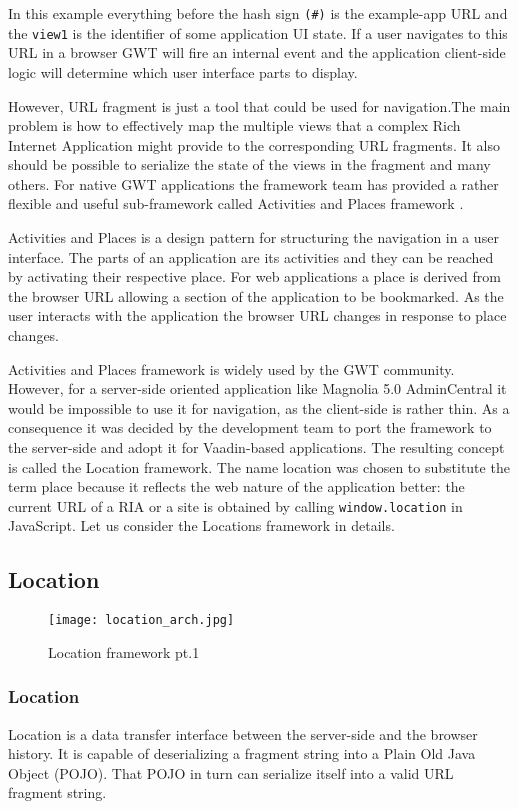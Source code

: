 In this example everything before the hash sign \texttt{(\#)} is the example-app
URL and the \texttt{view1} is the identifier of some application UI state. If a
user navigates to this URL in a browser GWT will fire an internal event and the
application client-side logic will determine which user interface parts to
display.

However, URL fragment is just a tool that could be used for navigation.The main
problem is how to effectively map the multiple views that a complex Rich
Internet Application might provide to the corresponding URL fragments. It also
should be possible to serialize the state of the views in the fragment and many
others.
For native GWT applications the framework team has provided a rather flexible
and useful sub-framework called Activities and Places framework
\cite{activities_places}.

Activities and Places is a design pattern for structuring the navigation in a
user interface. The parts of an application are its activities and they can be
reached by activating their respective place. For web applications a place is
derived from the browser URL allowing a section of the application to be
bookmarked. As the user interacts with the application the browser URL changes
in response to place changes.

Activities and Places framework is widely used by the GWT community. However,
for a server-side oriented application like Magnolia 5.0 AdminCentral it would
be impossible to use it for navigation, as the client-side is rather thin. As a
consequence it was decided by the development team to port the framework to the
server-side and adopt it for Vaadin-based applications. The resulting concept is
called the Location framework. The name location was chosen to substitute the
term place because it reflects the web nature of the application better: the
current URL of a RIA or a site is obtained by calling \texttt{window.location}
in JavaScript.  Let us consider the Locations framework in details.

\subsection{Location}

\begin{figure}[H] \centering \texttt{[image: location\_arch.jpg]}
	\caption{Location framework pt.1}
	\label{fig:location_arch}
\end{figure}

\subsubsection{Location} 
Location is a data transfer interface between the server-side and
the browser history. It is capable of deserializing a fragment string into a 
Plain Old Java Object (POJO). That POJO in turn can serialize itself into a
valid URL fragment string.


